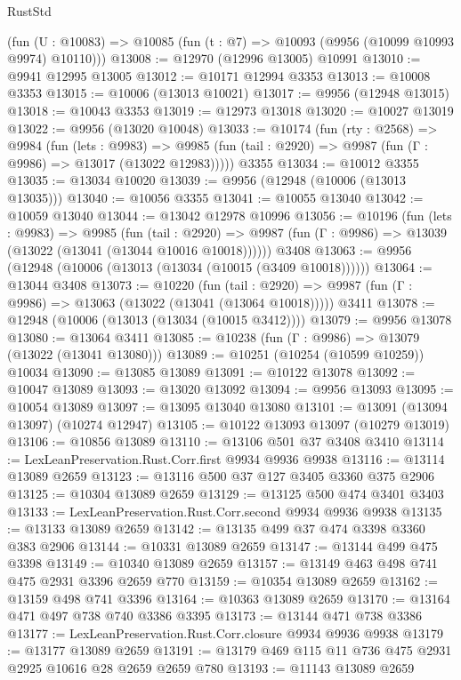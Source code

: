 \begin{lexlean}{RustStd}
\begin{coremodule}
    (fun (U : @10083) => @10085 (fun (t : @7) => @10093 (@9956 (@10099 @10993 @9974) @10110)))
@13008 := @12970 (@12996 @13005) @10991
@13010 := @9941 @12995 @13005
@13012 := @10171 @12994 @3353
@13013 := @10008 @3353
@13015 := @10006 (@13013 @10021)
@13017 := @9956 (@12948 @13015)
@13018 := @10043 @3353
@13019 := @12973 @13018
@13020 := @10027 @13019
@13022 := @9956 (@13020 @10048)
@13033 := @10174
    (fun (rty : @2568) =>
    @9984
      (fun (lets : @9983) =>
      @9985 (fun (tail : @2920) => @9987 (fun (Γ : @9986) => @13017 (@13022 @12983)))))
    @3355
@13034 := @10012 @3355
@13035 := @13034 @10020
@13039 := @9956 (@12948 (@10006 (@13013 @13035)))
@13040 := @10056 @3355
@13041 := @10055 @13040
@13042 := @10059 @13040
@13044 := @13042 @12978 @10996
@13056 := @10196
    (fun (lets : @9983) =>
    @9985
      (fun (tail : @2920) =>
      @9987 (fun (Γ : @9986) => @13039 (@13022 (@13041 (@13044 @10016 @10018))))))
    @3408
@13063 := @9956 (@12948 (@10006 (@13013 (@13034 (@10015 (@3409 @10018))))))
@13064 := @13044 @3408
@13073 := @10220
    (fun (tail : @2920) => @9987 (fun (Γ : @9986) => @13063 (@13022 (@13041 (@13064 @10018)))))
    @3411
@13078 := @12948 (@10006 (@13013 (@13034 (@10015 @3412))))
@13079 := @9956 @13078
@13080 := @13064 @3411
@13085 := @10238 (fun (Γ : @9986) => @13079 (@13022 (@13041 @13080)))
@13089 := @10251 (@10254 (@10599 @10259)) @10034
@13090 := @13085 @13089
@13091 := @10122 @13078
@13092 := @10047 @13089
@13093 := @13020 @13092
@13094 := @9956 @13093
@13095 := @10054 @13089
@13097 := @13095 @13040 @13080
@13101 := @13091 (@13094 @13097) (@10274 @12947)
@13105 := @10122 @13093 @13097 (@10279 @13019)
@13106 := @10856 @13089
@13110 := @13106 @501 @37 @3408 @3410
@13114 := LexLeanPreservation.Rust.Corr.first @9934 @9936 @9938
@13116 := @13114 @13089 @2659
@13123 := @13116 @500 @37 @127 @3405 @3360 @375 @2906
@13125 := @10304 @13089 @2659
@13129 := @13125 @500 @474 @3401 @3403
@13133 := LexLeanPreservation.Rust.Corr.second @9934 @9936 @9938
@13135 := @13133 @13089 @2659
@13142 := @13135 @499 @37 @474 @3398 @3360 @383 @2906
@13144 := @10331 @13089 @2659
@13147 := @13144 @499 @475 @3398
@13149 := @10340 @13089 @2659
@13157 := @13149 @463 @498 @741 @475 @2931 @3396 @2659 @770
@13159 := @10354 @13089 @2659
@13162 := @13159 @498 @741 @3396
@13164 := @10363 @13089 @2659
@13170 := @13164 @471 @497 @738 @740 @3386 @3395
@13173 := @13144 @471 @738 @3386
@13177 := LexLeanPreservation.Rust.Corr.closure @9934 @9936 @9938
@13179 := @13177 @13089 @2659
@13191 := @13179 @469 @115 @11 @736 @475 @2931 @2925 @10616 @28 @2659 @2659 @780
@13193 := @11143 @13089 @2659

\end{coremodule}
\end{lexlean}
